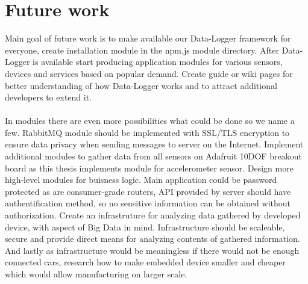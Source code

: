 \section{Future work} %
\label{sec:future_work}
Main goal of future work is to make available our Data-Logger framework for everyone, create installation module in the npm.js module directory. After Data-Logger is available start producing application modules for various sensors, devices and services based on popular demand. Create guide or wiki pages for better understanding of how Data-Logger works and to attract additional developers to extend it.\\\\
In modules there are even more possibilities what could be done so we name a few. RabbitMQ module should be implemented with SSL/TLS encryption to ensure data privacy when sending messages to server on the Internet. Implement additional modules to gather data from all sensors on Adafruit 10DOF breakout board as this thesis implements module for accelerometer sensor. Design more high-level modules for buisness logic.
Main application could be password protected as are consumer-grade routers, API provided by server should have authentification method, so no sensitive information can be obtained without authorization. Create an infrastruture for analyzing data gathered by developed device, with aspect of Big Data in mind. Infrastructure should be scaleable, secure and provide direct means for analyzing contents of gathered information. And lastly as infrastructure would be meaningless if there would not be enough connected cars, research how to make embedded device smaller and cheaper which would allow manufacturing on larger scale.
